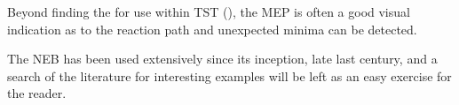 Beyond finding the  for use within TST (), the MEP is often a good visual indication as to the reaction path and unexpected minima can be detected.

The NEB has been used extensively since its inception, late last century, and a search of the literature for interesting examples will be left as an easy exercise for the reader.
